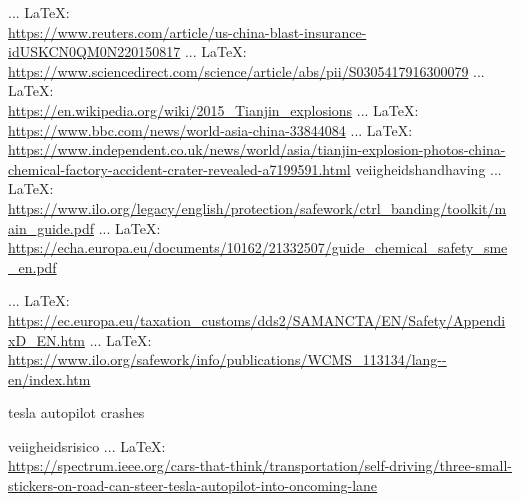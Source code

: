 \begin{thebibliography}{99}
{{{{				 ... \LaTeX:\\ \url{https://www.reuters.com/article/us-china-blast-insurance-idUSKCN0QM0N220150817}
				 ... \LaTeX:\\ \url{https://www.sciencedirect.com/science/article/abs/pii/S0305417916300079}
				 ... \LaTeX:\\ \url{https://en.wikipedia.org/wiki/2015_Tianjin_explosions}
				 ... \LaTeX:\\ \url{https://www.bbc.com/news/world-asia-china-33844084}
				 ... \LaTeX:\\ \url{https://www.independent.co.uk/news/world/asia/tianjin-explosion-photos-china-chemical-factory-accident-crater-revealed-a7199591.html}
				veiigheidshandhaving
				 ... \LaTeX:\\ \url{https://www.ilo.org/legacy/english/protection/safework/ctrl_banding/toolkit/main_guide.pdf}
				 ... \LaTeX:\\ \url{https://echa.europa.eu/documents/10162/21332507/guide_chemical_safety_sme_en.pdf}
				
				 ... \LaTeX:\\ \url{https://ec.europa.eu/taxation_customs/dds2/SAMANCTA/EN/Safety/AppendixD_EN.htm}
				 ... \LaTeX:\\ \url{https://www.ilo.org/safework/info/publications/WCMS_113134/lang--en/index.htm}
				
				
				tesla autopilot crashes
				
				
				veiigheidsrisico
				 ... \LaTeX:\\ \url{https://spectrum.ieee.org/cars-that-think/transportation/self-driving/three-small-stickers-on-road-can-steer-tesla-autopilot-into-oncoming-lane}
				
}}}}
\end{thebibliography}
